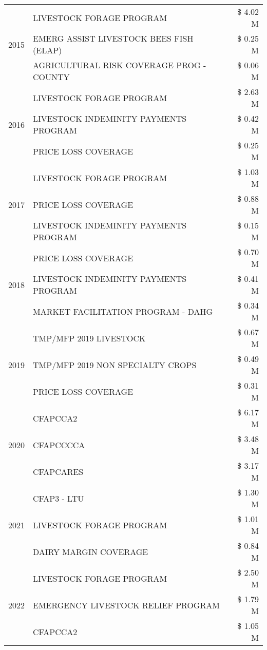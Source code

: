 \begin{tabular}{llr}
\multirow[t]{3}{*}{2015} & LIVESTOCK FORAGE PROGRAM & \$ 4.02 M \\
 & EMERG ASSIST LIVESTOCK BEES FISH (ELAP) & \$ 0.25 M \\
 & AGRICULTURAL RISK COVERAGE PROG - COUNTY & \$ 0.06 M \\
\cline{1-3}
\multirow[t]{3}{*}{2016} & LIVESTOCK FORAGE PROGRAM & \$ 2.63 M \\
 & LIVESTOCK INDEMINITY PAYMENTS PROGRAM & \$ 0.42 M \\
 & PRICE LOSS COVERAGE & \$ 0.25 M \\
\cline{1-3}
\multirow[t]{3}{*}{2017} & LIVESTOCK FORAGE PROGRAM & \$ 1.03 M \\
 & PRICE LOSS COVERAGE & \$ 0.88 M \\
 & LIVESTOCK INDEMINITY PAYMENTS PROGRAM & \$ 0.15 M \\
\cline{1-3}
\multirow[t]{3}{*}{2018} & PRICE LOSS COVERAGE & \$ 0.70 M \\
 & LIVESTOCK INDEMINITY PAYMENTS PROGRAM & \$ 0.41 M \\
 & MARKET FACILITATION PROGRAM - DAHG & \$ 0.34 M \\
\cline{1-3}
\multirow[t]{3}{*}{2019} & TMP/MFP 2019 LIVESTOCK & \$ 0.67 M \\
 & TMP/MFP 2019 NON SPECIALTY CROPS & \$ 0.49 M \\
 & PRICE LOSS COVERAGE & \$ 0.31 M \\
\cline{1-3}
\multirow[t]{3}{*}{2020} & CFAPCCA2 & \$ 6.17 M \\
 & CFAPCCCCA & \$ 3.48 M \\
 & CFAPCARES & \$ 3.17 M \\
\cline{1-3}
\multirow[t]{3}{*}{2021} & CFAP3 - LTU & \$ 1.30 M \\
 & LIVESTOCK FORAGE PROGRAM & \$ 1.01 M \\
 & DAIRY MARGIN COVERAGE & \$ 0.84 M \\
\cline{1-3}
\multirow[t]{3}{*}{2022} & LIVESTOCK FORAGE PROGRAM & \$ 2.50 M \\
 & EMERGENCY LIVESTOCK RELIEF PROGRAM & \$ 1.79 M \\
 & CFAPCCA2 & \$ 1.05 M \\
\cline{1-3}
\bottomrule
\end{tabular}
